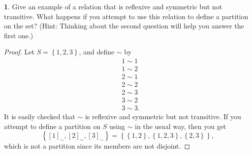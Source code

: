 \documentclass{article}
\newcounter{section-number}
\theoremstyle{definition}
\newtheorem{ex}{}[section-number]
\begin{document}
\begin{ex}
	Give an example of a relation that is reflexive and symmetric but not transitive.
	What happens if you attempt to use this relation to define a partition on the set?
	(Hint: Thinking about the second question will help you answer the first one.)
\end{ex}
\begin{proof}
	Let $S = \left\lbrace 1, 2, 3 \right\rbrace$, and define $\sim$ by \begin{align*}
		 & 1 \sim 1  \\
		 & 1 \sim 2  \\
		 & 2 \sim 1  \\
		 & 2 \sim 2  \\
		 & 2 \sim 3  \\
		 & 3 \sim 2  \\
		 & 3 \sim 3.
	\end{align*}
	It is easily checked that $\sim$ is reflexive and symmetric but not transitive.
	If you attempt to define a partition on $S$ using $\sim$ in the usual way, then you get \begin{equation*}
		\left\lbrace [1]_\sim, [2]_\sim, [3]_\sim \right\rbrace = \left\lbrace \left\lbrace 1, 2 \right\rbrace, \left\lbrace 1, 2, 3 \right\rbrace, \left\lbrace 2, 3 \right\rbrace \right\rbrace,
	\end{equation*}
	which is not a partition since its members are not disjoint.
\end{proof}
\end{document}
